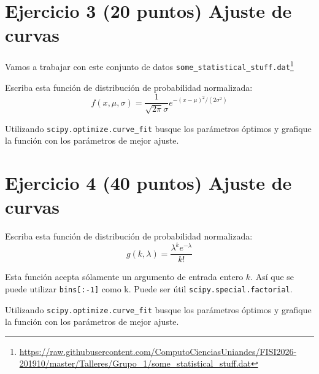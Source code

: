 \documentclass{article}
\begin{document}
\section{Ejercicio 3 (20 puntos) Ajuste de curvas}

Vamos a trabajar con este conjunto de datos \texttt{some\_statistical\_stuff.dat}\footnote{\url{https://raw.githubusercontent.com/ComputoCienciasUniandes/FISI2026-201910/master/Talleres/Grupo_1/some_statistical_stuff.dat}}

Escriba esta función de distribución de probabilidad normalizada:
\begin{equation}
  f(x,\mu,\sigma) = \frac{1}{\sqrt{2 \pi} \sigma} e^{-(x-\mu)^2/(2\sigma^2)}
\end{equation}

Utilizando \texttt{scipy.optimize.curve\_fit} busque los parámetros óptimos
y grafique la función con los parámetros de mejor ajuste.


\section{Ejercicio 4 (40 puntos) Ajuste de curvas}

Escriba esta función de distribución de probabilidad normalizada:
\begin{equation}
  g(k,\lambda) = \frac{\lambda^k e^{-\lambda}}{k!}
\end{equation}

Esta función acepta sólamente un argumento de entrada entero $k$. Así
que se puede utilizar \texttt{bins[:-1]} como k. Puede ser útil \texttt{scipy.special.factorial}.

\bigskip

Utilizando \texttt{scipy.optimize.curve\_fit} busque los parámetros óptimos
y grafique la función con los parámetros de mejor ajuste.
\end{document}
